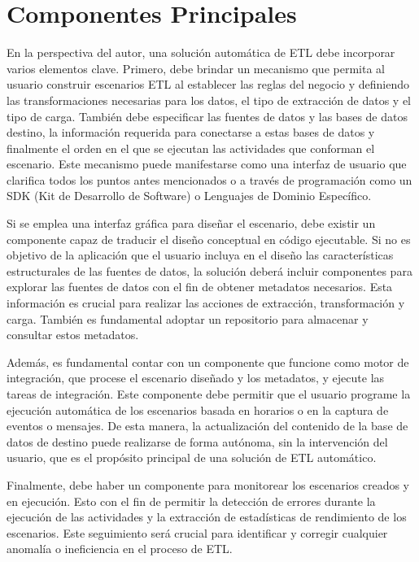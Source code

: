 \section{Componentes Principales} \label{section:PrincipalComp}

En la perspectiva del autor, una solución automática de ETL debe incorporar varios elementos clave. Primero, debe brindar 
un mecanismo que permita al usuario construir escenarios ETL al establecer las reglas del negocio y definiendo las 
transformaciones necesarias para los datos, el tipo de extracción de datos y el tipo de carga. 
También debe especificar las fuentes de datos y las bases de datos destino, 
la información requerida para conectarse a estas bases de datos y finalmente el orden en el que se ejecutan las actividades 
que conforman el escenario. Este mecanismo puede manifestarse como una interfaz de usuario que clarifica todos los puntos 
antes mencionados o a través de programación como un SDK (Kit de Desarrollo de Software) o Lenguajes de Dominio Específico.

Si se emplea una interfaz gráfica para diseñar el escenario, debe existir un componente capaz de traducir el diseño 
conceptual en código ejecutable. Si no es objetivo de la aplicación que el usuario incluya en el diseño las características 
estructurales de las fuentes de datos, la solución deberá incluir componentes para explorar 
las fuentes de datos con el fin de obtener metadatos necesarios. Esta información es crucial para realizar las acciones 
de extracción, transformación y carga. También es fundamental adoptar un repositorio para almacenar y consultar estos 
metadatos.

Además, es fundamental contar con un componente que funcione como motor de integración, que procese el escenario diseñado y 
los metadatos, y ejecute las tareas de integración. Este componente debe permitir que el usuario programe la ejecución 
automática de los escenarios basada en horarios o en la captura de eventos o mensajes. De esta manera, la actualización 
del contenido de la base de datos de destino puede realizarse de forma autónoma, sin la intervención del usuario, que es 
el propósito principal de una solución de ETL automático.

Finalmente, debe haber un componente para monitorear los escenarios creados y en ejecución. Esto con el fin de permitir 
la detección de errores durante la ejecución de las actividades y la extracción de estadísticas de rendimiento de los 
escenarios. Este seguimiento será crucial para identificar y corregir cualquier anomalía o ineficiencia en el proceso 
de ETL.  

 